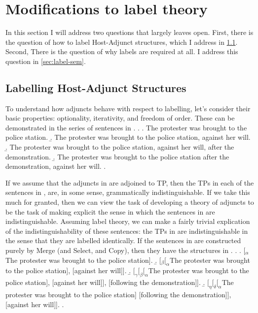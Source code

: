 \documentclass[MilwayThesis]{subfiles}
\begin{document}
\section{Modifications to label theory}\label{sec:modifications}

In this section I will address two questions that \textcite{chomsky2013problems,chomsky2015problems} largely leaves open.
First, there is the question of how to label Host-Adjunct structures, which I address in \cref{sec:adjuncts}.
Second, There is the question of why labels are required at all.
I address this question in \cref{sec:label-sem}.
%
\subsection{Labelling Host-Adjunct Structures}\label{sec:adjuncts}
To understand how adjuncts behave with respect to labelling, let's consider their basic properties: optionality, iterativity, and freedom of order.
These can be demonstrated in the series of sentences in \Next.
\ex. 
\a. The protester was brought to the police station.
\b. The protester was brought to the police station, against her will.
\b. The protester was brought to the police station, against her will, after the demonstration.
\b. The protester was brought to the police station after the demonstration, against her will.
\z.

If we assume that the adjuncts in \Last are adjoined to TP, then the TPs in each of the sentences in \Last, are, in some sense, grammatically indistinguishable.
If we take this much for granted, then we can view the task of developing a theory of adjuncts to be the task of making explicit the sense in which the sentences in \Last are indistinguishable.
Assuming label theory, we can make a fairly trivial explication of the indistinguishability of these sentences: the TPs in \Last are indistinguishable in the sense that they are labelled identically.
If the sentences in \Last are constructed purely by Merge (and Select, and Copy), then they have the structures in \Next.
\ex.
\a. [$_\alpha$ The protester was brought to the police station].
\b. [$_{\beta} [_{\alpha}$The protester was brought to the police station], [against her will]].
\b. $[_{\gamma}[_{\beta}[_{\alpha}$The protester was brought to the police station], [against her will]], [following the demonstration]].
\b. $[_{\eta} [_{\delta} [_{\alpha}$The protester was brought to the police station] [following the demonstration]], [against her will]].
\z.
\end{document}
